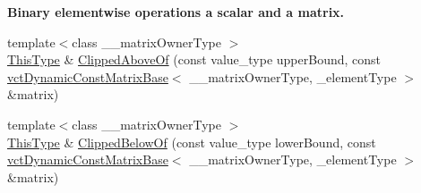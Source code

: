 \begin{Indent}{\bf Binary elementwise operations a scalar and a matrix.}
\begin{DoxyCompactItemize}
\item 
{\footnotesize template$<$class \+\_\+\+\_\+matrix\+Owner\+Type $>$ }\\\hyperlink{classvct_dynamic_const_matrix_base_ac4ff48cbe4d9de3fdef5a02447ffb9db}{This\+Type} \& \hyperlink{classvct_dynamic_matrix_base_ac047486d2126001761d88dbd6f1dd89c}{Clipped\+Above\+Of} (const value\+\_\+type upper\+Bound, const \hyperlink{classvct_dynamic_const_matrix_base}{vct\+Dynamic\+Const\+Matrix\+Base}$<$ \+\_\+\+\_\+matrix\+Owner\+Type, \+\_\+element\+Type $>$ \&matrix)
\item 
{\footnotesize template$<$class \+\_\+\+\_\+matrix\+Owner\+Type $>$ }\\\hyperlink{classvct_dynamic_const_matrix_base_ac4ff48cbe4d9de3fdef5a02447ffb9db}{This\+Type} \& \hyperlink{classvct_dynamic_matrix_base_af932e2333a7c1307baabaad78f216a7e}{Clipped\+Below\+Of} (const value\+\_\+type lower\+Bound, const \hyperlink{classvct_dynamic_const_matrix_base}{vct\+Dynamic\+Const\+Matrix\+Base}$<$ \+\_\+\+\_\+matrix\+Owner\+Type, \+\_\+element\+Type $>$ \&matrix)
\end{DoxyCompactItemize}
\end{Indent}
